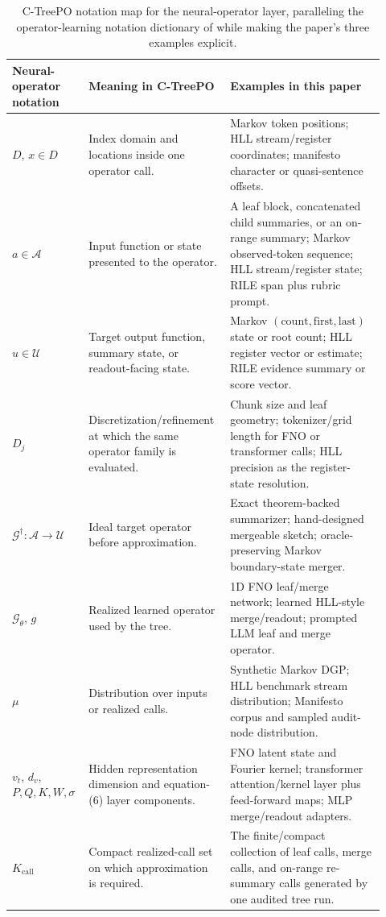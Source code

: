 \begin{table}[htbp]
\centering
\footnotesize
\setlength{\tabcolsep}{3pt}
\begin{tabular}{p{0.18\linewidth}p{0.34\linewidth}p{0.40\linewidth}}
\toprule
Neural-operator notation & Meaning in C-TreePO & Examples in this paper \\
\midrule
$D$, $x\in D$ &
Index domain and locations inside one operator call. &
Markov token positions; HLL stream/register coordinates; manifesto character or quasi-sentence offsets. \\
$a\in\mathcal{A}$ &
Input function or state presented to the operator. &
A leaf block, concatenated child summaries, or an on-range summary; Markov observed-token sequence; HLL stream/register state; RILE span plus rubric prompt. \\
$u\in\mathcal{U}$ &
Target output function, summary state, or readout-facing state. &
Markov $(\text{count},\text{first},\text{last})$ state or root count; HLL register vector or estimate; RILE evidence summary or score vector. \\
$D_j$ &
Discretization/refinement at which the same operator family is evaluated. &
Chunk size and leaf geometry; tokenizer/grid length for FNO or transformer calls; HLL precision as the register-state resolution. \\
$\mathcal{G}^{\dagger}:\mathcal{A}\to\mathcal{U}$ &
Ideal target operator before approximation. &
Exact theorem-backed summarizer; hand-designed mergeable sketch; oracle-preserving Markov boundary-state merger. \\
$\mathcal{G}_{\theta}$, $g$ &
Realized learned operator used by the tree. &
1D FNO leaf/merge network; learned HLL-style merge/readout; prompted LLM leaf and merge operator. \\
$\mu$ &
Distribution over inputs or realized calls. &
Synthetic Markov DGP; HLL benchmark stream distribution; Manifesto corpus and sampled audit-node distribution. \\
$v_t$, $d_v$, $P,Q,K,W,\sigma$ &
Hidden representation dimension and equation-(6) layer components. &
FNO latent state and Fourier kernel; transformer attention/kernel layer plus feed-forward maps; MLP merge/readout adapters. \\
$K_{\mathrm{call}}$ &
Compact realized-call set on which approximation is required. &
The finite/compact collection of leaf calls, merge calls, and on-range re-summary calls generated by one audited tree run. \\
\bottomrule
\end{tabular}
\caption{C-TreePO notation map for the neural-operator layer, paralleling the operator-learning notation dictionary of \citet[Table~10]{Kovachki23NeuralOperator} while making the paper's three examples explicit.}
\label{tab:ctreepo-neural-operator-notation}
\end{table}

